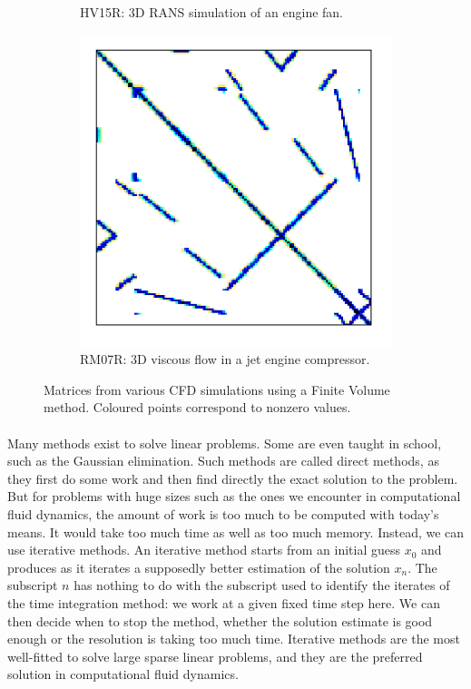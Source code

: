 \begin{figure}
\begin{subfigure}[t]{0.3\textwidth}
  				\caption{HV15R: 3D RANS simulation of an engine fan.}
  				\label{fig:sparse.HV15R}
  			\end{subfigure}
  			\hfill
  			\begin{subfigure}[t]{0.3\textwidth}
  				\centering
  				\includegraphics[width=\textwidth]{figures/RM07R.png}
  				\caption{RM07R: 3D viscous flow in a jet engine compressor.}
  				\label{fig:sparse.RM07R}
  			\end{subfigure}
  			\caption{Matrices from various CFD simulations \cite{PacullAubertBuisson2011} using a Finite Volume method. Coloured points correspond to nonzero values.}
  			\label{fig:sparse}
  		\end{figure}

      \paragraph{}
      Many methods exist to solve linear problems.
      Some are even taught in school, such as the Gaussian elimination.
      Such methods are called direct methods, as they first do some work and then find directly the exact solution to the problem.
      But for problems with huge sizes such as the ones we encounter in computational fluid dynamics, the amount of work is too much to be computed with today's means.
      It would take too much time as well as too much memory.
      Instead, we can use iterative methods.
      An iterative method starts from an initial guess $x_0$ and produces as it iterates a supposedly better estimation of the solution $x_n$.
      The subscript $n$ has nothing to do with the subscript used to identify the iterates of the time integration method: we work at a given fixed time step here.
      We can then decide when to stop the method, whether the solution estimate is good enough or the resolution is taking too much time.
      Iterative methods are the most well-fitted to solve large sparse linear problems, and they are the preferred solution in computational fluid dynamics.


